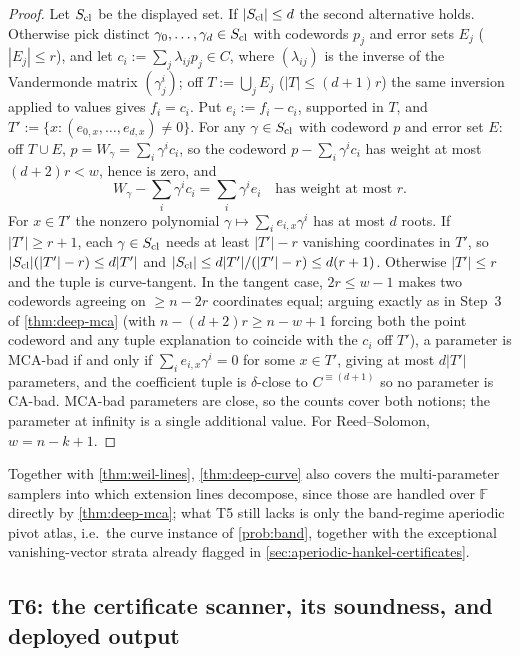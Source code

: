 \documentclass[11pt]{article}
\theoremstyle{definition}
\theoremstyle{remark}
\newcommand{\F}{\mathbb{F}}
\begin{document}
\begin{proof}
Let $S_{\rm cl}$ be the displayed set. If $|S_{\rm cl}|\le d$ the second alternative holds. Otherwise pick distinct $\gamma_0,\dots,\gamma_d\in S_{\rm cl}$ with codewords $p_j$ and error sets $E_j$ ($|E_j|\le r$), and let $c_i:=\sum_j\lambda_{ij}p_j\in C$, where $(\lambda_{ij})$ is the inverse of the Vandermonde matrix $(\gamma_j^i)$; off $T:=\bigcup_jE_j$ ($|T|\le(d+1)r$) the same inversion applied to values gives $f_i=c_i$. Put $e_i:=f_i-c_i$, supported in $T$, and $T':=\{x:(e_{0,x},\dots,e_{d,x})\ne0\}$. For any $\gamma\in S_{\rm cl}$ with codeword $p$ and error set $E$: off $T\cup E$, $p=W_\gamma=\sum_i\gamma^ic_i$, so the codeword $p-\sum_i\gamma^ic_i$ has weight at most $(d+2)r<w$, hence is zero, and
\[
W_\gamma-\sum_i\gamma^ic_i=\sum_i\gamma^ie_i
\quad\text{has weight at most }r .
\]
For $x\in T'$ the nonzero polynomial $\gamma\mapsto\sum_ie_{i,x}\gamma^i$ has at most $d$ roots. If $|T'|\ge r+1$, each $\gamma\in S_{\rm cl}$ needs at least $|T'|-r$ vanishing coordinates in $T'$, so $|S_{\rm cl}|(|T'|-r)\le d|T'|$ and $|S_{\rm cl}|\le d|T'|/(|T'|-r)\le d(r+1)$. Otherwise $|T'|\le r$ and the tuple is curve-tangent. In the tangent case, $2r\le w-1$ makes two codewords agreeing on $\ge n-2r$ coordinates equal; arguing exactly as in Step~3 of \cref{thm:deep-mca} \textup(with $n-(d+2)r\ge n-w+1$ forcing both the point codeword and any tuple explanation to coincide with the $c_i$ off $T'$\textup), a parameter is MCA-bad if and only if $\sum_ie_{i,x}\gamma^i=0$ for some $x\in T'$, giving at most $d|T'|$ parameters, and the coefficient tuple is $\delta$-close to $C^{\equiv(d+1)}$ so no parameter is CA-bad. MCA-bad parameters are close, so the counts cover both notions; the parameter at infinity is a single additional value. For Reed--Solomon, $w=n-k+1$.
\end{proof}

Together with \cref{thm:weil-lines}, \cref{thm:deep-curve} also covers the multi-parameter samplers into which extension lines decompose, since those are handled over $\F$ directly by \cref{thm:deep-mca}; what T5 still lacks is only the band-regime aperiodic pivot atlas, i.e.\ the curve instance of \cref{prob:band}, together with the exceptional vanishing-vector strata already flagged in \cref{sec:aperiodic-hankel-certificates}.

\subsection{T6: the certificate scanner, its soundness, and deployed output}\label{sec:discharge-T6}
\end{document}
